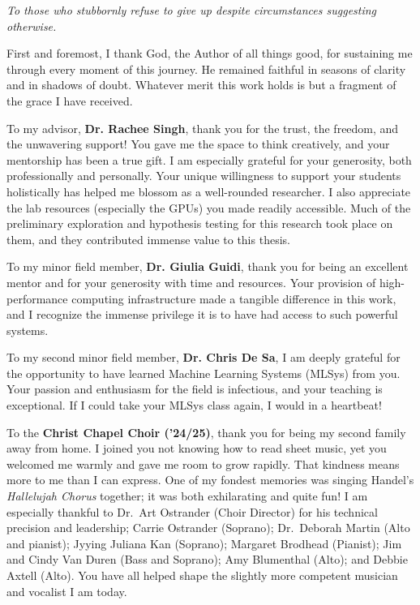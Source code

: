 \begin{dedication}
    \textit{To those who stubbornly refuse to give up despite circumstances suggesting otherwise.}
\end{dedication}

\begin{acknowledgements}
    First and foremost, I thank God, the Author of all things good,
    for sustaining me through every moment of this journey.
    He remained faithful in seasons of clarity and in shadows of doubt.
    Whatever merit this work holds is but a fragment of the grace I have received.

    To my advisor, \textbf{Dr. Rachee Singh}, thank you for the trust, the freedom, and the unwavering support!
    You gave me the space to think creatively, and your mentorship has been a true gift.
    I am especially grateful for your generosity, both professionally and personally.
    Your unique willingness to support your students holistically has
    helped me blossom as a well-rounded researcher.
    I also appreciate the lab resources (especially the GPUs) you made readily accessible.
    Much of the preliminary exploration and hypothesis testing for this research took place on them,
    and they contributed immense value to this thesis.

    To my minor field member, \textbf{Dr. Giulia Guidi}, thank you for being an excellent mentor
    and for your generosity with time and resources.
    Your provision of high-performance computing infrastructure made a tangible difference in this work,
    and I recognize the immense privilege it is to have had access to such powerful systems.

    To my second minor field member, \textbf{Dr. Chris De Sa}, I am deeply grateful for the opportunity to
    have learned Machine Learning Systems (MLSys) from you.
    Your passion and enthusiasm for the field is infectious, and your teaching is exceptional.
    If I could take your MLSys class again, I would in a heartbeat!

    To the \textbf{Christ Chapel Choir (’24/25)}, thank you for being my second family away from home.
    I joined you not knowing how to read sheet music, yet you welcomed me warmly and gave me room to grow rapidly.
    That kindness means more to me than I can express.
    One of my fondest memories was singing Handel’s \textit{Hallelujah Chorus} together; it was both exhilarating
    and quite fun!
    I am especially thankful to Dr.\ Art Ostrander (Choir Director) for his technical precision and leadership;
    Carrie Ostrander (Soprano);
    Dr.\ Deborah Martin (Alto and pianist);
    Jyying Juliana Kan (Soprano);
    Margaret Brodhead (Pianist); Jim and Cindy Van Duren (Bass and Soprano);
    Amy Blumenthal (Alto); and Debbie Axtell (Alto).
    You have all helped shape the slightly more competent musician and vocalist I am today.


\end{acknowledgements}
